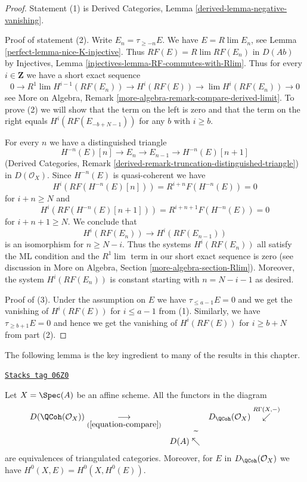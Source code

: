 \begin{proof}

Statement (1) is
Derived Categories, Lemma \ref{derived-lemma-negative-vanishing}.

\medskip\noindent
Proof of statement (2). Write $E_n = \tau_{\geq -n}E$. We have
$E = R\lim E_n$, see Lemma \ref{perfect-lemma-nice-K-injective}. Thus
$RF(E) = R\lim RF(E_n)$ in $D(\textit{Ab})$ by Injectives, Lemma
\ref{injectives-lemma-RF-commutes-with-Rlim}. Thus for every $i \in \mathbf{Z}$
we have a short exact sequence
$$
0 \to R^1\lim H^{i - 1}(RF(E_n)) \to H^i(RF(E)) \to \lim H^i(RF(E_n)) \to 0
$$
see More on Algebra, Remark
\ref{more-algebra-remark-compare-derived-limit}.
To prove (2) we will show that the term on the left is zero
and that the term on the right equals $H^i(RF(E_{-b + N - 1}))$
for any $b$ with $i \geq b$.

\medskip\noindent
For every $n$ we have a distinguished triangle
$$
H^{-n}(E)[n] \to E_n \to E_{n - 1} \to H^{-n}(E)[n + 1]
$$
(Derived Categories, Remark
\ref{derived-remark-truncation-distinguished-triangle})
in $D(\mathcal{O}_X)$. Since $H^{-n}(E)$ is quasi-coherent we have
$$
H^i(RF(H^{-n}(E)[n])) = R^{i + n}F(H^{-n}(E)) = 0
$$
for $i + n \geq N$ and
$$
H^i(RF(H^{-n}(E)[n + 1])) = R^{i + n + 1}F(H^{-n}(E)) = 0
$$
for $i + n + 1 \geq N$. We conclude that
$$
H^i(RF(E_n)) \to H^i(RF(E_{n - 1}))
$$
is an isomorphism for $n \geq N - i$. Thus the systems $H^i(RF(E_n))$ all
satisfy the ML condition and the $R^1\lim$ term in our short exact
sequence is zero (see discussion in
More on Algebra, Section \ref{more-algebra-section-Rlim}).
Moreover, the system $H^i(RF(E_n))$ is constant starting
with $n = N - i - 1$ as desired.

\medskip\noindent
Proof of (3). Under the assumption on $E$ we have
$\tau_{\leq a - 1}E = 0$ and we get the vanishing
of $H^i(RF(E))$ for $i \leq a - 1$ from (1).
Similarly, we have $\tau_{\geq b + 1}E = 0$ and hence
we get the vanishing of $H^i(RF(E))$ for $i \geq b + N$ from
part (2).
\end{proof}

The following lemma is the key ingredient to many of the
results in this chapter.

\begin{lemma}
\label{perfect-lemma-affine-compare-bounded}
\href{https://stacks.math.columbia.edu/tag/06Z0}{\texttt{Stacks tag 06Z0}}

Let $X = \Spec(A)$ be an affine scheme. All the functors in the diagram
$$
\begin{array}{ccc}D(\QCoh(\mathcal{O}_X)) \underset{(\ref{equation-compare})}{\longrightarrow} &  & D_\QCoh(\mathcal{O}_X) \overset{R\Gamma(X, -)}{\swarrow} \\  & D(A) \overset{\widetilde{\ \ }}{\nwarrow} & \end{array}
$$
are equivalences of triangulated categories. Moreover, for $E$ in
$D_\QCoh(\mathcal{O}_X)$ we have $H^0(X, E) = H^0(X, H^0(E))$.
\end{lemma}

